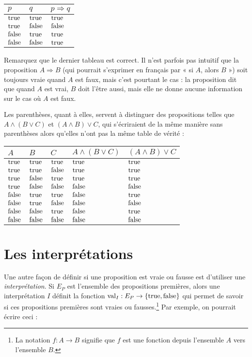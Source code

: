 \begin{tabular}{ll|l}
  $p$ & $q$ & $p \Rightarrow q$ \\
  \hline

  $\mathrm{true}$ & $\mathrm{true}$ & $\mathrm{true}$ \\
  $\mathrm{true}$ & $\mathrm{false}$ & $\mathrm{false}$ \\
  $\mathrm{false}$ & $\mathrm{true}$ & $\mathrm{true}$ \\
  $\mathrm{false}$ & $\mathrm{false}$ & $\mathrm{true}$
\end{tabular}
\vspace{2 mm}

Remarquez que le dernier tableau est correct. Il n’est parfois pas intuitif
que la proposition $A \Rightarrow B$ (qui pourrait s’exprimer en français
par « si $A$, alors $B$ ») soit toujours vraie quand $A$ est faux, mais c’est
pourtant le cas : la proposition dit que quand $A$ est vrai, $B$ doit
l’être aussi, mais elle ne donne aucune information sur le cas où $A$ est
faux.

Les parenthèses, quant à elles, servent à distinguer des propositions telles
que $A \land (B \lor C)$ et $(A \land B) \lor C$, qui s’écriraient de la
même manière sans parenthèses alors qu’elles n’ont pas la même table de
vérité :

\begin{tabular}{lll|ll}
  $A$ & $B$ & $C$ & $A \land (B \lor C)$ & $(A \land B) \lor C$ \\
  \hline

  $\mathrm{true}$  & $\mathrm{true}$  & $\mathrm{true}$  & $\mathrm{true}$  & $\mathrm{true}$  \\
  $\mathrm{true}$  & $\mathrm{true}$  & $\mathrm{false}$ & $\mathrm{true}$  & $\mathrm{true}$  \\
  $\mathrm{true}$  & $\mathrm{false}$ & $\mathrm{true}$  & $\mathrm{true}$  & $\mathrm{true}$  \\
  $\mathrm{true}$  & $\mathrm{false}$ & $\mathrm{false}$ & $\mathrm{false}$ & $\mathrm{false}$ \\
  $\mathrm{false}$ & $\mathrm{true}$  & $\mathrm{true}$  & $\mathrm{false}$ & $\mathrm{true}$  \\
  $\mathrm{false}$ & $\mathrm{true}$  & $\mathrm{false}$ & $\mathrm{false}$ & $\mathrm{false}$ \\
  $\mathrm{false}$ & $\mathrm{false}$ & $\mathrm{true}$  & $\mathrm{false}$ & $\mathrm{true}$  \\
  $\mathrm{false}$ & $\mathrm{false}$ & $\mathrm{false}$ & $\mathrm{false}$ & $\mathrm{false}$
\end{tabular}

\section{Les interprétations}

Une autre façon de définir si une proposition est vraie ou fausse est d’utiliser
une \textit{interprétation}. Si $E_P$ est l’ensemble des propositions premières,
alors une interprétation $I$ définit la fonction $\mathrm{val}_I : E_P \rightarrow
\{\mathrm{true}, \mathrm{false}\}$ 
qui permet de savoir si ces propositions premières sont vraies ou fausses.\footnote{La notation
$f : A \rightarrow B$ signifie que $f$
est une fonction depuis l’ensemble $A$ vers l’ensemble $B$.  } 
Par exemple, on pourrait écrire ceci :

